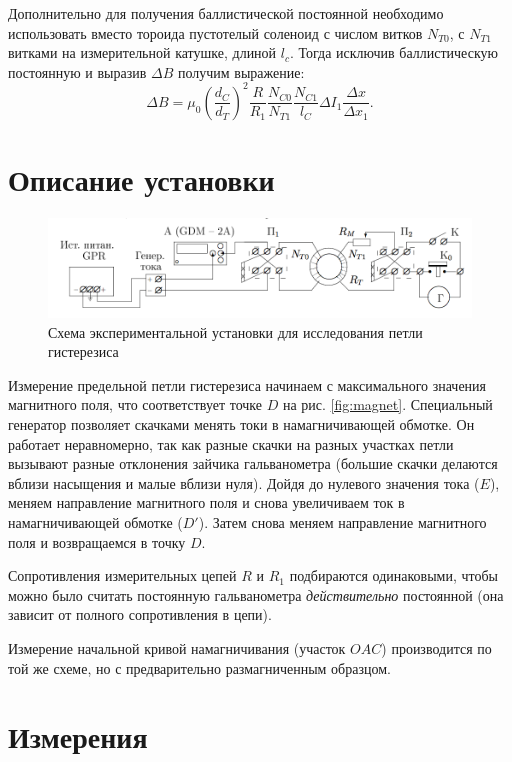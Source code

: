 \documentclass{letnab}
\begin{document}
Дополнительно для получения баллистической постоянной необходимо использовать вместо тороида пустотелый соленоид с числом витков $N_{T0}$, с $N_{T1}$ витками на измерительной катушке, длиной $l_c$. Тогда исключив баллистическую постоянную и выразив $\Delta B$ получим выражение:
$$\Delta B  = \mu_0 \left( \dfrac{d_C}{d_T} \right)^2 \dfrac{R}{R_1} \dfrac{N_{C0}}{N_{T1}} \dfrac{N_{C1}}{l_C} \Delta I_1 \dfrac{\Delta x}{\Delta x_1}.$$

\section{Описание установки}

\begin{figure}[H]
\centering
\includegraphics[width = 0.9 \tw]{scheme}
\caption{Схема экспериментальной установки для исследования петли гистерезиса}
\end{figure}

Измерение предельной петли гистерезиса начинаем с максимального значения магнитного поля, что соответствует точке $D$ на рис. \ref{fig:magnet}. Специальный генератор позволяет скачками менять токи в намагничивающей обмотке. Он работает неравномерно, так как разные скачки на разных участках петли вызывают разные отклонения зайчика гальванометра (большие скачки делаются вблизи насыщения и малые вблизи нуля). Дойдя до нулевого значения тока ($E$), меняем направление магнитного поля и снова увеличиваем ток в намагничивающей обмотке ($D'$). Затем снова меняем направление магнитного поля и возвращаемся в точку $D$.

Сопротивления измерительных цепей $R$ и $R_1$ подбираются одинаковыми, чтобы можно было считать постоянную гальванометра \emph{действительно} постоянной (она зависит от полного сопротивления в цепи).

Измерение начальной кривой намагничивания (участок $OAC$) производится по той же схеме, но с предварительно размагниченным образцом. 

\section{Измерения}
\end{document}
